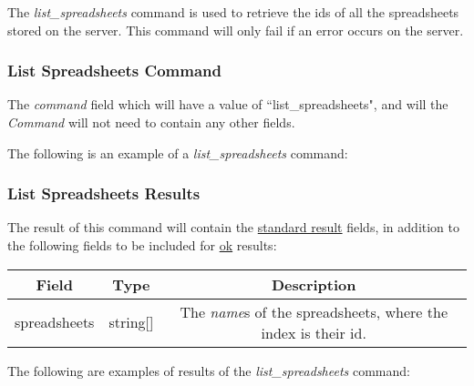 The \emph{list\_spreadsheets} command is used to retrieve the ids of all the 
spreadsheets stored on the server. This command will only fail if an error 
occurs on the server.

\subsubsection{List Spreadsheets Command}
The \emph{command} field which will have a value of ``list\_spreadsheets", and will the \emph{Command} will not need to contain any other fields.

The following is an example of a \emph{list\_spreadsheets} command:


\subsubsection{List Spreadsheets Results}
The result of this command will contain the \hyperref[sec:message:result]{standard result} fields, in addition to the following fields to be included for \underline{ok} results:
\begin{table}[H]
    \begin{center}
        \begin{tabular}{|c|c|c|}\hline
            Field & Type & Description \\\hline
            spreadsheets & string[] & The \emph{name}s of the spreadsheets, where the index is their id. \\\hline
        \end{tabular}
    \end{center}
\end{table}

The following are examples of results of the \emph{list\_spreadsheets} command:




